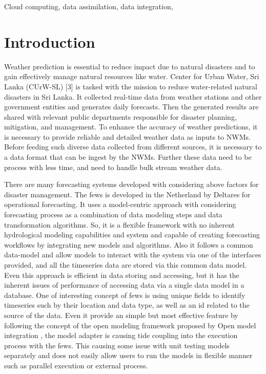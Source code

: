 \documentclass[conference]{IEEEtran}
\newcommand{\db}[1]{\textcolor{blue!40}{#1}}
\begin{document}
\begin{IEEEkeywords}
\db{Cloud computing, data assimilation, data integration, }
\end{IEEEkeywords}

\section{Introduction}
\label{pse:Introduction}
Weather prediction is essential to reduce impact due to natural disasters and to gain
effectively manage natural resources like water.
Center for Urban Water, Sri Lanka (CUrW-SL) [3] is tasked with the mission to reduce water-related natural disasters in Sri Lanka.
It collected real-time data from weather stations and other government entities and generates daily forecasts. Then the generated results are shared with relevant public departments responsible for disaster planning, mitigation, and management.
To enhance the accuracy of weather predictions, it is necessary to provide reliable and
detailed weather data as inputs to NWMs.
Before feeding such diverse data collected from different sources, it is necessary to a data format that can be ingest by the NWMs.
Further these data need to be process with less time, and need to handle bulk stream weather data.

There are many forecasting systems developed with considering above factors for disaster management. The \acrshort{fews} is developed in the Netherland by Deltares for operational forecasting. It uses a model-centric approach with considering forecasting process as a combination of data modeling steps and data transformation algorithms. So, it is a flexible framework with no inherent hydrological modeling capabilities and system and capable of creating forecasting workflows by integrating new models and algorithms. Also it follows a common data-model and allow models to interact with the system via one of the interfaces provided, and all the timeseries data are stored via this common data model. Even this approach is efficient in data storing and accessing, but it has the inherent issues of performance of accessing data via a single data model in a database. One of interesting concept of \acrshort{fews} is using unique fields to identify timeseries such by their location and data type, as well as an id related to the source of the data. Even it provide an simple but most effective feature by following the concept of the open modeling framework proposed by Open model integration \cite{Kokkonen2003InterfacingXML}, the model adapter is causing tide coupling into the execution process with the \acrshort{fews}. This causing some issue with unit testing models separately and does not easily allow users to run the models in flexible manner such as parallel execution or external process.
\end{document}
